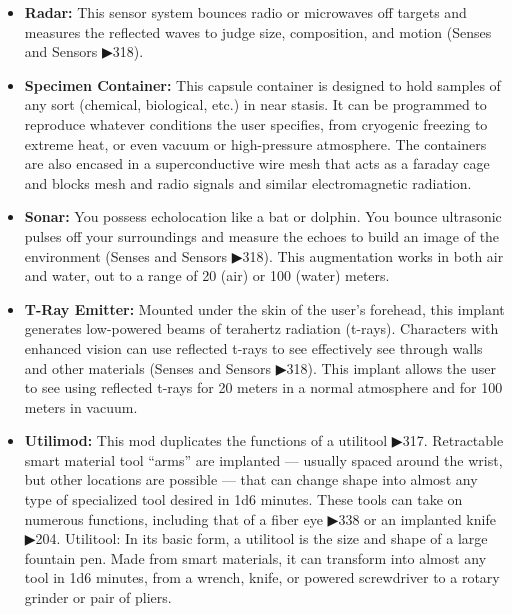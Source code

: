 \begin{itemize}
    \item \textbf{Radar:} This sensor system bounces radio or microwaves off targets and measures the reflected waves to judge size, composition, and motion (Senses and Sensors ▶318). \citep[pg. 318]{ep2e_1.1_2019}

    \item \textbf{Specimen Container:} This capsule container is designed to hold samples of any sort (chemical, biological, etc.) in near stasis. It can be programmed to reproduce whatever conditions the user specifies, from cryogenic freezing to extreme heat, or even vacuum or high-pressure atmosphere. The containers are also encased in a superconductive wire mesh that acts as a faraday cage and blocks mesh and radio signals and similar electromagnetic radiation. \citep[pg. 340]{ep2e_1.1_2019}

    \item \textbf{Sonar:} You possess echolocation like a bat or dolphin. You bounce ultrasonic pulses off your surroundings and measure the echoes to build an image of the environment (Senses and Sensors ▶318). This augmentation works in both air and water, out to a range of 20 (air) or 100 (water) meters. \citep[pg. 318]{ep2e_1.1_2019}

    \item \textbf{T-Ray Emitter:} Mounted under the skin of the user’s forehead, this implant generates low-powered beams of terahertz radiation (t-rays). Characters with enhanced vision can use reflected t-rays to see effectively see through walls and other materials (Senses and Sensors ▶318). This implant allows the user to see using reflected t-rays for 20 meters in a normal atmosphere and for 100 meters in vacuum. \citep[pg. 318]{ep2e_1.1_2019}

    \item \textbf{Utilimod:} This mod duplicates the functions of a utilitool ▶317. Retractable smart material tool “arms” are implanted — usually spaced around the wrist, but other locations are possible — that can change shape into almost any type of specialized tool desired in 1d6 minutes. These tools can take on numerous functions, including that of a fiber eye ▶338 or an implanted knife ▶204. Utilitool: In its basic form, a utilitool is the size and shape of a large fountain pen. Made from smart materials, it can transform into almost any tool in 1d6 minutes, from a wrench, knife, or powered screwdriver to a rotary grinder or pair of pliers. \citep[pg. 325]{ep2e_1.1_2019}
\end{itemize}

